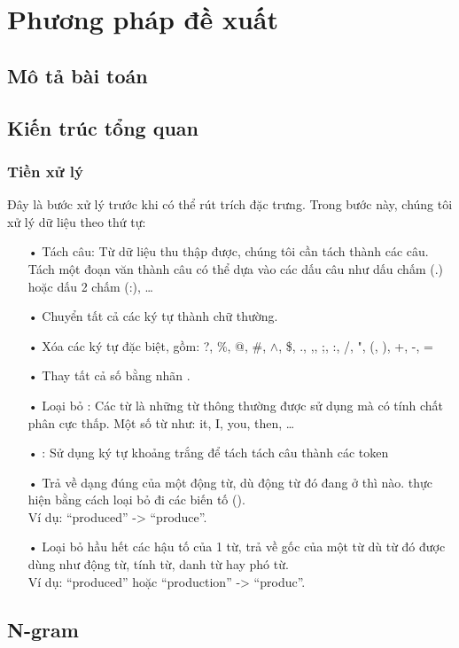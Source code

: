 \section{Phương pháp đề xuất}	\label{section:phuongphapdexuat}
\subsection{Mô tả bài toán}
\subsection{Kiến trúc tổng quan}
\subsubsection*{Tiền xử lý} \label{sec:tien-xu-ly}
Đây là bước xử lý trước khi có thể rút trích đặc trưng. Trong bước này, chúng tôi xử lý dữ liệu theo thứ tự:
\begin{itemize}
\item[•] Tách câu: Từ dữ liệu thu thập được, chúng tôi cần tách thành các câu. Tách một đoạn văn thành câu có thể dựa vào các dấu câu như dấu chấm (.) hoặc dấu 2 chấm (:), \ldots
\item[•] Chuyển tất cả các ký tự thành chữ thường.
\item[•] Xóa các ký tự đặc biệt, gồm: ?, \%, @, \#, $\wedge$, \$, ., ,,  ;, :, /, ", (, ), +, -, =
\item[•] Thay tất cả số bằng nhãn .
\item[•] Loại bỏ : Các từ  là những từ thông thường được sử dụng mà có tính chất phân cực thấp. Một số từ  như: it, I, you, then, \ldots
\item[•] : Sử dụng ký tự khoảng trắng để tách tách câu thành các token
\item[•]  Trả về dạng đúng của một động từ, dù động từ đó đang ở thì nào.  thực hiện bằng cách loại bỏ đi các biến tố (). \\
Ví dụ: ``produced'' -> ``produce''.
\item[•]  Loại bỏ hầu hết các hậu tố của 1 từ, trả về gốc của một từ dù từ đó được dùng như động từ, tính từ, danh từ hay phó từ.\\
 Ví dụ:  ``produced'' hoặc ``production'' -> ``produc''.
\end{itemize}
\subsection{N-gram} \label{sec:ngram}
